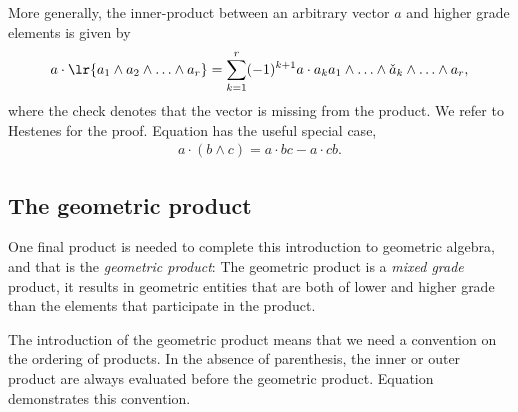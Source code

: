 More generally, the inner-product between an arbitrary vector $a$ and higher grade elements is given by
\begin{align}
  a \cdot \lr{a_1\wedge a_2 \wedge\ldots \wedge a_r} = 
  \sum_{k=1}^r (-1)^{k+1} a\cdot a_k a_1 \wedge \ldots \wedge \check{a}_k
  \wedge \ldots \wedge a_r,
 \label{eqn:dot_multiwedge}
\end{align}
where the check denotes that the vector is missing from the product.
We refer to Hestenes\cite{Hestenes1984} for the proof.
Equation 
has the useful special case,
\begin{align}
 a\cdot (b \wedge c) = a \cdot b c - a\cdot c b.
 \label{eqn:dot_wedge}
\end{align}

\subsection{The geometric product}

One final product is needed to complete this introduction to geometric algebra,
and that is the {\em geometric product}:
The geometric product is a {\em mixed grade} product,
it results in geometric entities that are both of lower and higher grade than the elements that participate in the product.

The introduction of the geometric product means that we need a convention on the ordering of products.  In the absence of parenthesis, the inner or outer product are always evaluated before the geometric product.  Equation  demonstrates this convention. 


